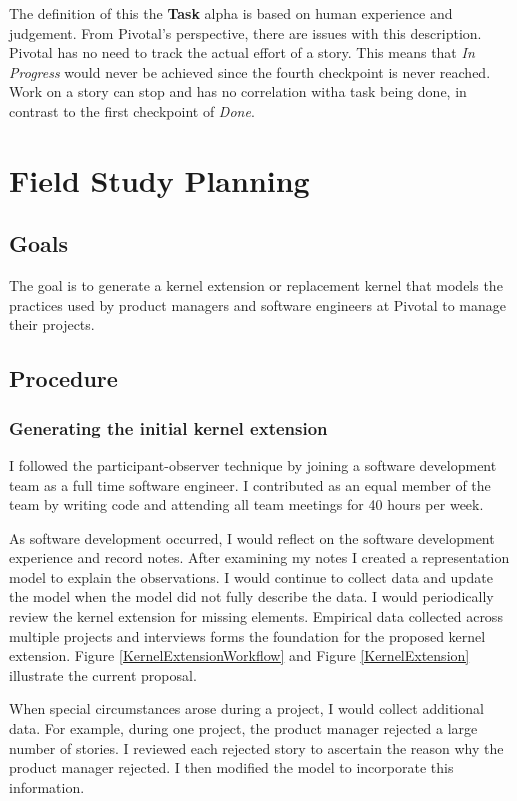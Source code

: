 \documentclass[preprint,12pt,3p]{elsarticle}
\begin{document}
The definition of this the \textbf{Task} alpha is based on human experience and judgement. From Pivotal's perspective, there are issues with this description. Pivotal has no need to track the actual effort of a story. This means that \textit{In Progress} would never be achieved since the fourth checkpoint is never reached. Work on a story can stop and has no correlation witha task being done, in contrast to the first checkpoint of \textit{Done}. 

\section{Field Study Planning} 
\label{FieldStudyPlanning}

\subsection{Goals}
The goal is to generate a kernel extension or replacement kernel that models the practices used by product managers and software engineers at Pivotal to manage their projects.

\subsection{Procedure}
\subsubsection{Generating the initial kernel extension}
I followed the participant-observer technique by joining a software development team as a full time software engineer. I contributed as an equal member of the team by writing code and attending all team meetings for 40 hours per week. 

As software development occurred, I would reflect on the software development experience and record notes. After examining my notes I created a representation model to explain the observations. I would continue to collect data and update the model when the model did not fully describe the data. I would periodically review the kernel extension for missing elements. Empirical data collected across multiple projects and interviews forms the foundation for the proposed kernel extension. Figure \ref{KernelExtensionWorkflow} and Figure \ref{KernelExtension} illustrate the current proposal.

When special circumstances arose during a project, I would collect additional data. For example, during one project, the product manager rejected a large number of stories. I reviewed each rejected story to ascertain the reason why the product manager rejected. I then modified the model to incorporate this information.
\end{document}
